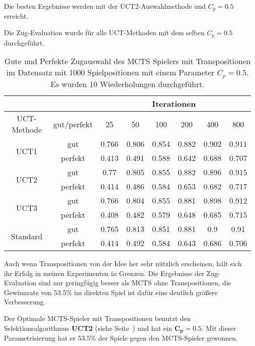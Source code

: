 Die besten Ergebnisse werden mit der UCT2-Auswahlmethode und $C_p=0.5$ erreicht. 

\pagebreak[4]
Die Zug-Evaluation wurde für alle UCT-Methoden mit dem selben $C_p=0.5$ durchgeführt.
\begin{table}[h!]
	\centering
	\begin{tabular}{|c||c|c|c|c|c|c|c|}
		\cline{3-8}
		\multicolumn{2}{c}{} & \multicolumn{6}{|c|}{Iterationen} \\
		\hline
		UCT-Methode & gut/perfekt & 25 & 50 & 100 & 200 & 400 & 800 \\
		\hline
		\multirow{2}{*}{UCT1} & gut & 0.766 & 0.806 & 0.854 & 0.882 & 0.902 & 0.911 \\
		\cline{2-8}
		 & perfekt & 0.413 & 0.491 & 0.588 & 0.642 & 0.688 & 0.707 \\
		\hline
		\multirow{2}{*}{UCT2} & gut & 0.77 & 0.805 & 0.855 & 0.882 & 0.896 & 0.915 \\
		\cline{2-8}
		 & perfekt & 0.414 & 0.486 & 0.584 & 0.653 & 0.682 & 0.717 \\
		\hline
		\multirow{2}{*}{UCT3} & gut & 0.766 & 0.804 & 0.855 & 0.881 & 0.898 & 0.912 \\
		\cline{2-8}
		 & perfekt & 0.408 & 0.482 & 0.579 & 0.648 & 0.685 & 0.715 \\
		\hline
		\multirow{2}{*}{Standard} & gut & 0.765 & 0.813 & 0.851 & 0.881 & 0.9 & 0.91 \\
		\cline{2-8}
		 & perfekt & 0.414 & 0.492 & 0.584 & 0.643 & 0.686 & 0.706 \\
		\hline
	\end{tabular}
	\caption{Gute und Perfekte Zugauswahl des MCTS Spielers mit Transpositionen im Datensatz mit 1000 Spielpositionen mit einem Parameter $C_p=0.5$. Es wurden 10 Wiederholungen durchgeführt.}
	\label{tab:transpos-move-eval}
\end{table}


Auch wenn Transpositionen von der Idee her sehr nützlich erscheinen, hält sich ihr Erfolg in meinen Experimenten in Grenzen.
Die Ergebnisse der Zug-Evaluation sind nur geringfügig besser als MCTS ohne Transpositionen, die Gewinnrate von 53.5\% im direkten Spiel ist dafür eine deutlich größere Verbesserung.

\bigskip
Der Optimale MCTS-Spieler mit Transpositionen benutzt den Selektionsalgorithmus \textbf{UCT2} (siehe Seite~\pageref{eqn:UCT2}) und hat ein $\mathbf{C_p=0.5}$. 
Mit dieser Parametrisierung hat er 53.5\% der Spiele gegen den MCTS-Spieler gewonnen.


